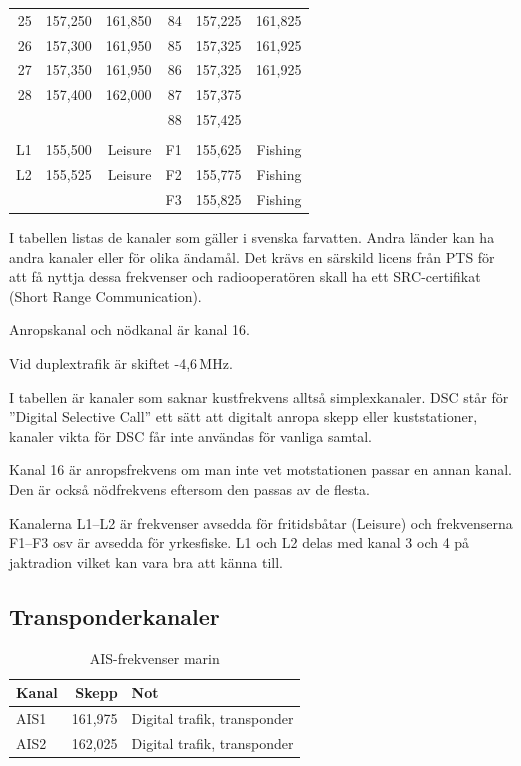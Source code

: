{\begin{longtable}{rrr|rrr}
25 & 157,250 & 161,850 & 84 & 157,225 & 161,825 \\
26 & 157,300 & 161,950 & 85 & 157,325 & 161,925 \\
27 & 157,350 & 161,950 & 86 & 157,325 & 161,925 \\
28 & 157,400 & 162,000 & 87 & 157,375 & \\
   &         &         & 88 & 157,425 & \\
   &         &         &    &         & \\
L1 & 155,500 & Leisure        & F1 & 155,625 &Fishing \\
L2 & 155,525 & Leisure        & F2 & 155,775 &Fishing \\
   &         &         & F3 & 155,825 & Fishing\\
\end{longtable}

I tabellen listas de kanaler som gäller i svenska farvatten. Andra
länder kan ha andra kanaler eller för olika ändamål. Det krävs en
särskild licens från PTS för att få nyttja dessa frekvenser och
radiooperatören skall ha ett SRC-certifikat (Short Range
Communication).

Anropskanal och nödkanal är kanal 16.

Vid duplextrafik är skiftet -4,6\,MHz.

I tabellen är kanaler som saknar kustfrekvens alltså
simplexkanaler. DSC står för ''Digital Selective Call'' ett sätt att
digitalt anropa skepp eller kuststationer, kanaler vikta för DSC får
inte användas för vanliga samtal.

Kanal 16 är anropsfrekvens om man inte vet motstationen passar en
annan kanal. Den är också nödfrekvens eftersom den passas av de
flesta.

Kanalerna L1--L2 är frekvenser avsedda för fritidsbåtar (Leisure) och
frekvenserna F1--F3 osv är avsedda för yrkesfiske. L1 och L2 delas med
kanal 3 och 4 på jaktradion vilket kan vara bra att känna till.

\subsection{Transponderkanaler}

\begin{table}[h]
\centering
\begin{tabular}{lrl}
	\textbf{Kanal} & \textbf{Skepp} & \textbf{Not}                \\ \hline
	AIS1           &        161,975 & Digital trafik, transponder \\
	AIS2           &        162,025 & Digital trafik, transponder
\end{tabular}
\caption{AIS-frekvenser marin}
\end{table}

}
